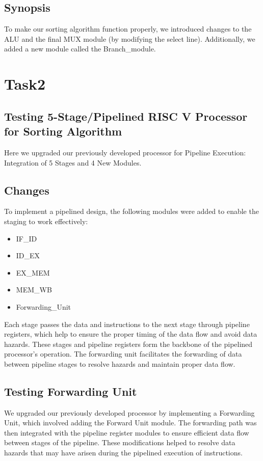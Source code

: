 \documentclass{report}
\begin{document}
\subsection{Synopsis}
    To make our sorting algorithm function properly, we introduced changes to the ALU and the final MUX module (by modifying the select line). Additionally, we added a new module called the Branch\_module.
\newpage
\section{Task2}
\subsection{Testing 5-Stage/Pipelined RISC V Processor for Sorting Algorithm}

Here we upgraded our previously developed processor for Pipeline Execution: Integration of 5 Stages and 4 New Modules.

\subsection{Changes}

To implement a pipelined design, the following modules were added to enable the staging to work effectively:
\begin{itemize}
\item IF\_ID
\item ID\_EX
\item EX\_MEM
\item MEM\_WB
\item Forwarding\_Unit
\end{itemize}

Each stage passes the data and instructions to the next stage through pipeline registers, which help to ensure the proper timing of the data flow and avoid data hazards. These stages and pipeline registers form the backbone of the pipelined processor's operation.  The forwarding unit facilitates the forwarding of data between pipeline stages to resolve hazards and maintain proper data flow.

\subsection{Testing Forwarding Unit}

We upgraded our previously developed processor by implementing a Forwarding Unit, which involved adding the Forward Unit module. The forwarding path was then integrated with the pipeline register modules to ensure efficient data flow between stages of the pipeline. These modifications helped to resolve data hazards that may have arisen during the pipelined execution of instructions.
\pagebreak
\end{document}
